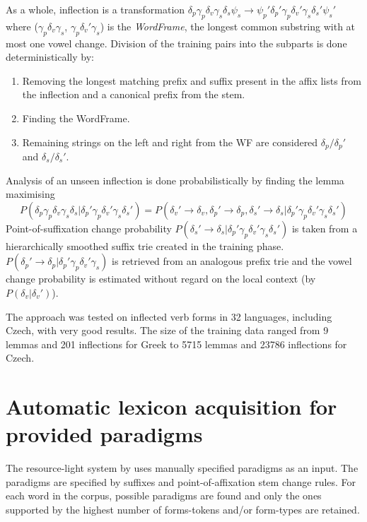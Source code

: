 As a whole, inflection is a transformation $\delta_p \gamma_p \delta_v \gamma_s \delta_s \psi_s \rightarrow \psi_p' \delta_p' \gamma_p \delta_v' \gamma_s \delta_s' \psi_s'$ where ($\gamma_p \delta_v \gamma_s$, $\gamma_p \delta_v' \gamma_s$) is the \emph{WordFrame}, the longest common substring with at most one vowel change. Division of the training pairs into the subparts is done deterministically by:
\begin{enumerate}
\item Removing the longest matching prefix and suffix present in the affix lists from the inflection and a canonical prefix from the stem.
\item Finding the WordFrame.
\item Remaining strings on the left and right from the WF are considered $\delta_p/\delta_p'$ and $\delta_s/\delta_s'$.
\end{enumerate}

Analysis of an unseen inflection is done probabilistically by finding the lemma maximising \[P(\delta_p \gamma_p \delta_v \gamma_s \delta_s |\delta_p' \gamma_p \delta_v' \gamma_s \delta_s') = P(\delta_v' \rightarrow \delta_v, \delta_p' \rightarrow \delta_p, \delta_s' \rightarrow \delta_s|\delta_p' \gamma_p \delta_v' \gamma_s \delta_s')\] 
Point-of-suffixation change probability $P(\delta_s' \rightarrow \delta_s|\delta_p' \gamma_p \delta_v' \gamma_s \delta_s')$ is taken from a hierarchically smoothed suffix trie created in the training phase. $P(\delta_p' \rightarrow \delta_p|\delta_p' \gamma_p \delta_v' \gamma_s )$ is retrieved from an analogous prefix trie and the vowel change probability is estimated without regard on the local context (by $P(\delta_v|\delta_v')$).

The approach was tested on inflected verb forms in 32 languages, including Czech, with very good results. The size of the training data ranged from 9 lemmas and 201 inflections for Greek to 5715 lemmas and 23786 inflections for Czech.

\section{Automatic lexicon acquisition for provided pa\-ra\-digms}
The resource-light system by \cite{feldman-hana-2010-rodopi} uses manually specified pa\-ra\-digms as an input. The paradigms are specified by suffixes and point-of-affixation stem change rules. For each word in the corpus, possible paradigms are found and only the ones supported by the highest number of forms-tokens and/or form-types are retained.

